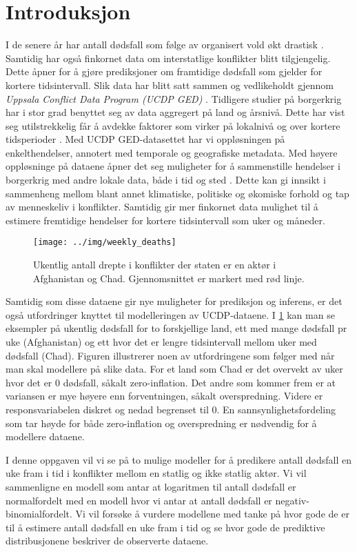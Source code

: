 \section{Introduksjon}

I de senere år har antall dødsfall som følge av organisert vold økt drastisk
\parencite{davies2022organized}. Samtidig har også finkornet data om
interstatlige konflikter blitt tilgjengelig. Dette åpner for å gjøre
prediksjoner om framtidige dødsfall som gjelder for kortere tidsintervall. Slik
data har blitt satt sammen og vedlikeholdt gjennom \textit{Uppsala Conflict
Data Program (UCDP GED)} \parencite{sundberg2013introducing}. Tidligere studier
på borgerkrig har i stor grad benyttet seg av data aggregert på land og
årsnivå. Dette har vist seg utilstrekkelig får å avdekke faktorer som virker på
lokalnivå og over kortere tidsperioder \parencite{raleigh2010introducing}. Med
UCDP GED-datasettet har vi oppløsningen på enkelthendelser, annotert med
temporale og geografiske metadata. Med høyere oppløsninge på dataene åpner det
seg muligheter for å sammenstille hendelser i borgerkrig med andre lokale data,
både i tid og sted \parencite{eck2012data}. Dette kan gi innsikt i sammenheng
mellom blant annet klimatiske, politiske og økomiske forhold og tap av menneskeliv i
konflikter. Samtidig gir mer finkornet data mulighet til å estimere fremtidige
hendelser for kortere tidsintervall som uker og måneder.

    \begin{figure}[!h]
    \centering
    \texttt{[image: ../img/weekly\_deaths]}
    \caption{Ukentlig antall drepte i konflikter der staten er en aktør i
        Afghanistan og Chad. Gjennomsnittet er markert med rød linje.}
    \label{fig:weekly_deaths}
    \end{figure}

Samtidig som disse dataene gir nye muligheter for prediksjon og inferens, er
det også utfordringer knyttet til modelleringen av UCDP-dataene. I
\cref{fig:weekly_deaths} kan man se eksempler på ukentlig dødsfall for to
forskjellige land, ett med mange dødsfall pr uke (Afghanistan) og ett hvor det
er lengre tidsintervall mellom uker med dødsfall (Chad). Figuren illustrerer
noen av utfordringene som følger med når man skal modellere på slike data.
For et land som Chad er det overvekt av uker hvor det er 0 dødsfall, såkalt
zero-inflation. Det andre som kommer frem er at variansen er mye høyere enn
forventningen, såkalt overspredning. Videre er responsvariabelen diskret og
nedad begrenset til 0. En sannsynlighetsfordeling som tar høyde for både
zero-inflation og overspredning er nødvendig for å modellere dataene.

I denne oppgaven vil vi se på to mulige modeller for å predikere antall
dødsfall en uke fram i tid i konflikter mellom en statlig og ikke statlig
aktør. Vi vil sammenligne en modell som antar at logaritmen til antall dødsfall
er normalfordelt med en modell hvor vi antar at antall dødsfall er
negativ-binomialfordelt. Vi vil forsøke å vurdere modellene med tanke på hvor
gode de er til å estimere antall dødsfall en uke fram i tid og se hvor gode de
prediktive distribusjonene beskriver de observerte dataene.
 

